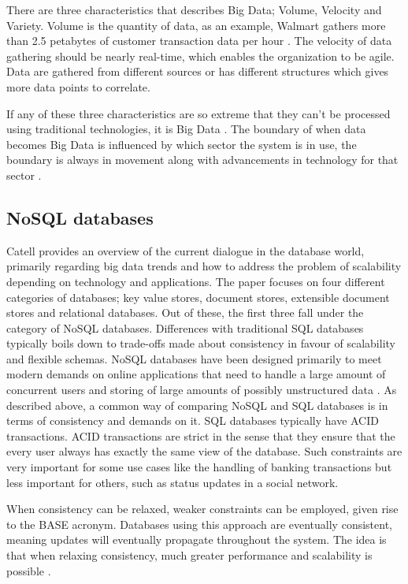 There are three characteristics that describes Big Data; Volume, Velocity and Variety. Volume is the quantity of data, as an example, Walmart gathers more than 2.5 petabytes of customer transaction data per hour \cite{bigDataMane}. The velocity of data gathering should be nearly real-time, which enables the organization to be agile. Data are gathered from different sources or has different structures which gives more data points to correlate.

If any of these three characteristics are so extreme that they can't be processed using traditional technologies, it is Big Data \cite{bigDataWarehouse}. The boundary of when data becomes Big Data is influenced by which sector the system is in use, the boundary is always in movement along with advancements in technology for that sector \cite{bigDatabigAn}. 


\subsection{NoSQL databases}
Catell \cite{Catell} provides an overview of the current dialogue in the database world, primarily regarding big data trends and how to address the problem of scalability depending on technology and applications. The paper focuses on four different categories of databases; key value stores, document stores, extensible document stores and relational databases. Out of these, the first three fall under the category of NoSQL databases. Differences with traditional SQL databases typically boils down to trade-offs made about consistency in favour of scalability and flexible schemas. NoSQL databases have been designed primarily to meet modern demands on online applications that need to handle a large amount of concurrent users and storing of large amounts of possibly unstructured data \cite{Catell}.   
As described above, a common way of comparing NoSQL and SQL databases is in terms of consistency and demands on it. SQL databases typically have ACID \cite{Mullins} transactions. ACID transactions are strict in the sense that they ensure that the every user always has exactly the same view of the database. Such constraints are very important for some use cases like the handling of banking transactions but less important for others, such as status updates in a social network.

When consistency can be relaxed, weaker constraints can be employed, given rise to the BASE \cite{Catell} acronym. Databases using this approach are eventually consistent, meaning updates will eventually propagate throughout the system. The idea is that when relaxing consistency, much greater performance and scalability is possible \cite{Catell}.

